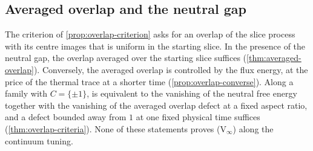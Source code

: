 \documentclass[11pt,a4paper]{amsart}
\theoremstyle{definition}
\theoremstyle{remark}
\numberwithin{equation}{section}
\newcommand{\Mcirc}{\text{\upshape(M$^{\circ}$)}}   %
\begin{document}
\subsection{Averaged overlap and the neutral gap}\label{sec:averaged-overlap}

The criterion of \cref{prop:overlap-criterion} asks for an overlap of the slice process with its centre images that is uniform in the starting slice. In the presence of the neutral gap, the overlap averaged over the starting slice suffices (\cref{thm:averaged-overlap}). Conversely, the averaged overlap is controlled by the flux energy, at the price of the thermal trace at a shorter time (\cref{prop:overlap-converse}). Along a family with $C=\{\pm1\}$, \Mcirc{} is equivalent to the vanishing of the neutral free energy together with the vanishing of the averaged overlap defect at a fixed aspect ratio, and a defect bounded away from $1$ at one fixed physical time suffices (\cref{thm:overlap-criteria}). None of these statements proves \textup{(V$_\infty$)} along the continuum tuning.
\end{document}

